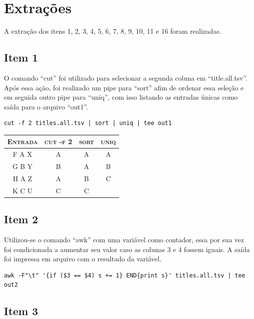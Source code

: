 \documentclass[12pt]{article}
\begin{document}
\section{Extrações}

A extração dos itens 1, 2, 3, 4, 5, 6, 7, 8, 9, 10, 11 e 16 foram realizadas.

\subsection*{Item 1}

O comando ``cut'' foi utilizado para selecionar a segunda coluna em ``title.all.tsv''. Após essa ação, foi realizado um pipe para ``sort'' afim de ordenar essa seleção e em seguida outro pipe para ``uniq'', com isso listando as entradas únicas como saída para o arquivo ``out1''.

\pagebreak

\begin{verbatim}
cut -f 2 titles.all.tsv | sort | uniq | tee out1 
\end{verbatim}

\begin{table}[!h]
    \begin{tabular}{ c c c c }
        \textsc{Entrada} & \textsc{cut -f 2} & \textsc{sort} & \textsc{uniq} \\ 
        \hline
        F A X & A & A & A \\ 
        G B Y & B & A & B \\
        H A Z & A & B & C \\
        K C U & C & C &   \\
    \end{tabular}
\end{table}

\subsection*{Item 2}

Utilizou-se o comando ``awk'' com uma variável como contador, essa por sua vez foi condicionada a aumentar seu valor caso as colunas 3 e 4 fossem iguais. A saída foi impressa em arquivo com o resultado da variável.

\begin{verbatim}
awk -F"\t" '{if ($3 == $4) s += 1} END{print s}' titles.all.tsv | tee out2
\end{verbatim}

\subsection*{Item 3}
\end{document}
